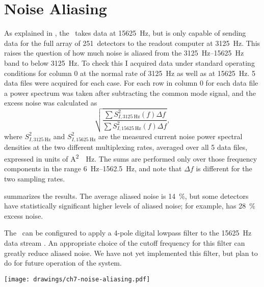 \section{Noise Aliasing}

As explained in , the \MCE\ takes data at \SI{15625}{\hertz}, but is only capable of sending data for the full array of 251~detectors to the readout computer at \SI{3125}{\hertz}.
This raises the question of how much noise is aliased from the \SIrange{3125}{15625}{\hertz} band to below \SI{3125}{\hertz}.
To check this I acquired data under standard operating conditions for column 0 at the normal rate of \SI{3125}{\hertz} as well as at \SI{15625}{\hertz}.
5 data files were acquired for each case. For each row in column 0 for each data file a power spectrum was taken after subtracting the common mode signal, and the excess noise was calculated as
\begin{equation}
  \sqrt{  \frac{ \sum S^2_{I,\SI{3125}{\Hz}}(f) \Delta f }
               { \sum S^2_{I,\SI{15625}{\Hz}}(f) \Delta f }},
\end{equation}
where $S^2_{I,\SI{3125}{\Hz}}$ and $S^2_{I,\SI{15625}{\Hz}}$ are the measured current noise power spectral densities at the two different multiplexing rates, averaged over all 5 data files, expressed in units of \si{\A^2 \per \Hz}.
The sums are performed only over those frequency components in the range \SIrange{6}{1562.5}{\Hz}, and note that $\Delta f$ is different for the two sampling rates.

 summarizes the results.
The average aliased noise is \SI{14}{\percent}, but some detectors have statistically significant higher levels of aliased noise; for example,  has \SI{28}{\percent} excess noise.

The \MCE\ can be configured to apply a 4-pole digital lowpass filter to the \SI{15625}{\Hz} data stream \cite{mce_team_digital_????}.
An appropriate choice of the cutoff frequency for this filter can greatly reduce aliased noise.
We have not yet implemented this filter, but plan to do for future operation of the system.

\begin{figure*}
  \centering
\texttt{[image: drawings/ch7-noise-aliasing.pdf]}
\caption{%
\textbf{Top}
Plot showing fractional excess noise (see text for definition) due to noise aliasing for all rows of column 0.
The error bars are for \SI{95}{\percent} confidence intervals, and the average excess noise is \SI{14}{\percent}.
\textbf{Bottom}
Sample power spectra at \SI{3125}{\hertz} and \SI{15625}{\hertz} for .
For this detector the excess noise is \SI{17}{\percent}.
}
\label{fig:ch7-noise-aliasing}
\end{figure*}

